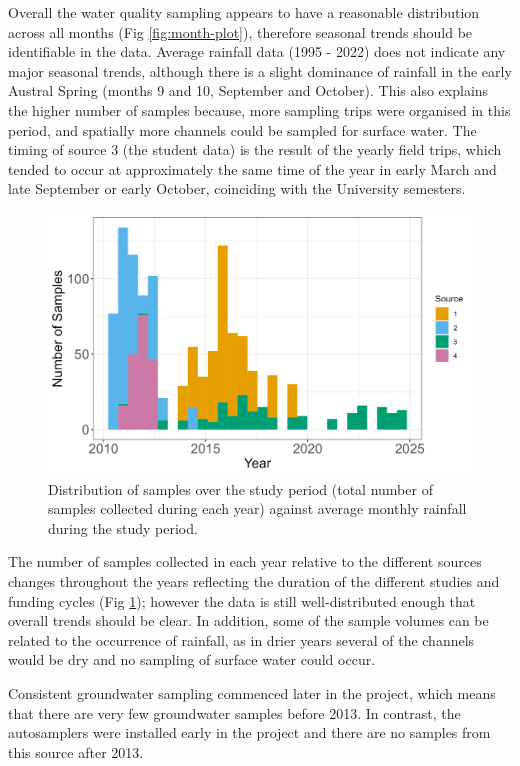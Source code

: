 \documentclass[, manuscript]{copernicus}
\begin{document}
Overall the water quality sampling appears to have a reasonable
distribution across all months (Fig \ref{fig:month-plot}), therefore
seasonal trends should be identifiable in the data. Average rainfall
data (1995 - 2022) does not indicate any major seasonal trends, although
there is a slight dominance of rainfall in the early Austral Spring
(months 9 and 10, September and October). This also explains the higher
number of samples because, more sampling trips were organised in this
period, and spatially more channels could be sampled for surface water.
The timing of source 3 (the student data) is the result of the yearly
field trips, which tended to occur at approximately the same time of the
year in early March and late September or early October, coinciding with
the University semesters.

\begin{figure}
\includegraphics[width=0.5\linewidth]{Figures/annual} \caption{Distribution of samples over the study period (total number of samples collected during each year) against average monthly rainfall during the study period. }\label{fig:annual-plot}
\end{figure}

The number of samples collected in each year relative to the different
sources changes throughout the years reflecting the duration of the
different studies and funding cycles (Fig \ref{fig:annual-plot});
however the data is still well-distributed enough that overall trends
should be clear. In addition, some of the sample volumes can be related
to the occurrence of rainfall, as in drier years several of the channels
would be dry and no sampling of surface water could occur.

Consistent groundwater sampling commenced later in the project, which
means that there are very few groundwater samples before 2013. In
contrast, the autosamplers were installed early in the project and there
are no samples from this source after 2013.
\end{document}
